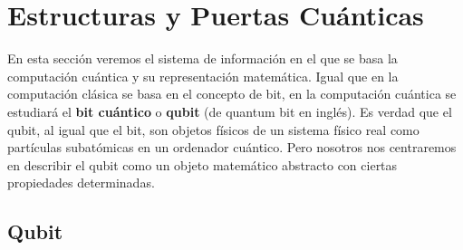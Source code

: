 \documentclass[a4paper]{article}
\numberwithin{equation}{section}
\begin{document}






\newpage

\section{Estructuras y Puertas Cuánticas}

En esta sección veremos el sistema de información en el que se basa la computación cuántica y su representación matemática. Igual que en la computación clásica se basa en el concepto de bit, en la computación cuántica se estudiará el \textbf{bit cuántico} o \textbf{qubit} (de quantum bit en inglés). Es verdad que el qubit, al igual que el bit, son objetos físicos de un sistema físico real como partículas subatómicas en un ordenador cuántico. Pero nosotros nos centraremos en describir el qubit como un objeto matemático abstracto con ciertas propiedades determinadas.


\subsection{Qubit}
\end{document}
